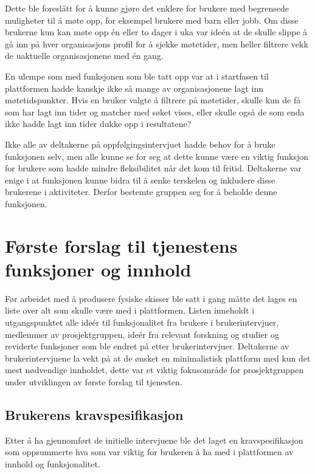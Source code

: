 Dette ble foreslått for å kunne gjøre det enklere for brukere med begrensede muligheter til å møte opp, for eksempel brukere med barn eller jobb. Om disse brukerne kun kan møte opp én eller to dager i uka var ideén at de skulle slippe å gå inn på hver organisasjons profil for å sjekke møtetider, men heller filtrere vekk de uaktuelle organisasjonene med én gang.

En ulempe som med funksjonen som ble tatt opp var at i startfasen til plattformen hadde kanskje ikke så mange av organisasjonene lagt inn møtetidspunkter. Hvis en bruker valgte å filtrere på møtetider, skulle kun de få som har lagt inn tider og matcher med søket vises, eller skulle også de som enda ikke hadde lagt inn tider dukke opp i resultatene?

Ikke alle av deltakerne på oppfølgingsintervjuet hadde behov for å bruke funksjonen selv, men alle kunne se for seg at dette kunne være en viktig funksjon for brukere som hadde mindre fleksibilitet når det kom til fritid. Deltakerne var enige i at funksjonen kunne bidra til å senke terskelen og inkludere disse brukerene i aktiviteter. Derfor bestemte gruppen seg for å beholde denne funksjonen.

\section{Første forslag til tjenestens funksjoner og innhold}

Før arbeidet med å produsere fysiske skisser ble satt i gang måtte det lages en liste over alt som skulle være med i plattformen. Listen inneholdt i utgangspunktet alle ideér til funksjonalitet fra brukere i brukerintervjuer, medlemmer av prosjektgruppen, ideér fra relevant forskning og studier og reviderte funksjoner som ble endret på etter brukerintervjuer. Deltakerne av brukerintervjuene la vekt på at de ønsket en minimalistisk plattform med kun det mest nødvendige innholdet, dette var et viktig fokusområde for prosjektgruppen under utviklingen av første forslag til tjenesten.

\subsection{Brukerens kravspesifikasjon}
Etter å ha gjennomført de initielle intervjuene ble det laget en kravspesifikasjon som oppsummerte hva som var viktig for brukeren å ha med i plattformen av innhold og funksjonalitet.

